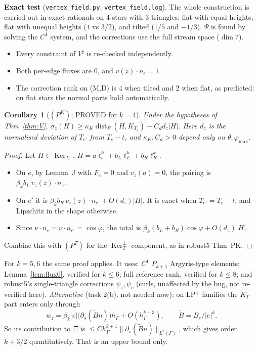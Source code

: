 \documentclass[11pt]{article}
\newtheorem{corollary}[theorem]{Corollary}
\theoremstyle{remark}
\newcommand{\hG}{h_\Gamma}
\begin{document}
\noindent\textbf{Exact test} (\texttt{vertex\_field.py}, \texttt{vertex\_field.log}). The whole construction is carried out in exact rationals on 4 stars with 3
triangles: flat with equal heights, flat with unequal heights ($1$ vs $3/2$), and tilted ($1/5$ and $-1/3$). $\Psi$ is found by solving the $C^1$ system, and the corrections
use the full stream space ($\dim7$).
\begin{itemize}
\item Every constraint of $V^\sharp$ is re-checked independently.
\item Both per-edge fluxes are $0$, and $v(z)\cdot n_e=1$.
\item The correction rank on (M,D) is $4$ when tilted and $2$ when flat, as predicted: on flat stars the normal parts hold automatically.
\end{itemize}

\begin{corollary}[$(P^K)$; PROVED for $k=4$]\label{cor:PK}
Under the hypotheses of Thm~\ref{thm:V}, $\sigma_z(H)\ge\kappa_K\operatorname{dist}_F(H,K_{T_e})-C_dd_z|H|$. Here $d_z$ is the
normalised deviation of $T_{e'}$ from $T_e-t$, and $\kappa_K,C_d>0$ depend only on $\theta,\varphi_{\max}$.
\end{corollary}
\begin{proof}
Let $H\in\operatorname{Ker}_{T_e}$, $H=a\ell_c^k+b_L\ell_L^k+b_R\ell_R^k$.
\begin{itemize}
\item On $e$, by Lemma~J with $F_e=0$ and $v_z(a)=0$, the pairing is $\beta_k b_L\,v_z(z)\cdot n_e$.
\item On $e'$ it is $\beta_k b_R\,v_z(z)\cdot n_{e'}+O(d_z)|H|$. It is exact when $T_{e'}=T_e-t$, and Lipschitz in the shape otherwise.
\item Since $\nu\cdot n_e=\nu\cdot n_{e'}=\cos\varphi$, the total is $\beta_k(b_L+b_R)\cos\varphi+O(d_z)|H|$.
\end{itemize}
Combine this with $(P^T)$ for the $\operatorname{Ker}_T^\perp$ component, as in robust5 Thm~PK.
\end{proof}
\noindent For $k=5,6$ the same proof applies. It uses: $C^1$ $P_{k+1}$ Argyris-type elements; Lemma~\ref{lem:flux0}, verified for $k\le6$;
full reference rank, verified for $k\le8$; and robust5's single-triangle corrections $\psi_z,\psi_c$ (curls, unaffected by the bug, not re-verified here).
\emph{Alternative} (task 2(b), not needed now): on LP$^+$ families the $K_T$ part enters only through
\[
w_z=\beta_k|e|\big(\partial_s(\tilde B n)\big)\hG+O(\hG^{k+3}),\qquad \tilde B=B_e/|e|^k .
\]
So its contribution to $\Xi$ is $\le C\hG^{k+1}\|\partial_s(\tilde Bn)\|_{L^2(\Gamma)}$, which gives order $k+3/2$ quantitatively. That is an upper bound only.
\end{document}
